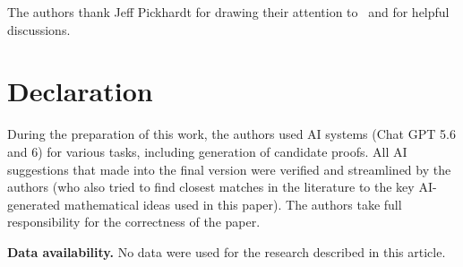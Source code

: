 \documentclass[10pt,a4paper]{article}
\numberwithin{equation}{section}
\theoremstyle{definition}
\theoremstyle{remark}
\begin{document}
The authors thank Jeff Pickhardt for drawing their attention to~\cite{Pickhardt26} and for helpful discussions.


\section*{Declaration}
During the preparation of this work, the authors used AI systems (Chat GPT 5.6 and 6) for various tasks, including generation of candidate
proofs. All AI
suggestions that made into the final version were verified and streamlined by the authors (who also tried to find closest matches in the literature to the key AI-generated mathematical ideas used in this paper). The authors take full responsibility for the correctness of the paper.


\smallskip
\noindent\textbf{Data availability.} No data were used for the research described in this article.






\end{document}
